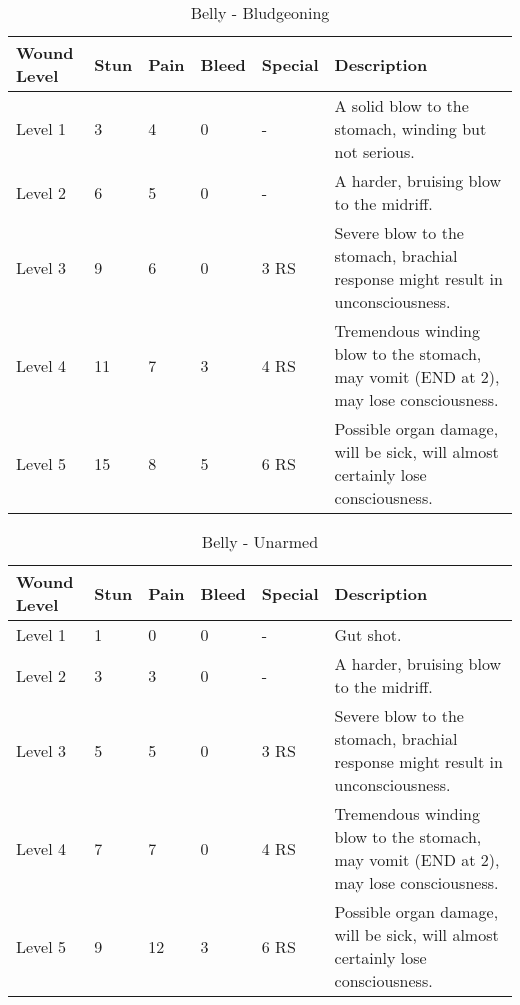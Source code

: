 \documentclass[oneside,11pt,english]{book}
\begin{document}
\begin{table}[hb] %
	\caption{Belly - Bludgeoning}
	\label{wound:Belly - Bludgeoning}
	\begin{tabu} to 
Wound Level &Stun &Pain &Bleed &Special &Description\\\toprule
Level 1& 3& 4& 0& - &A solid blow to the stomach, winding but not serious.\\
Level 2& 6& 5& 0& - &A harder, bruising blow to the midriff.\\
Level 3& 9& 6& 0&  3 RS &Severe blow to the stomach, brachial response might result in unconsciousness.\\
Level 4& 11& 7& 3&  4 RS &Tremendous winding blow to the stomach, may vomit (END at 2), may lose consciousness.\\
Level 5& 15& 8& 5&  6 RS &Possible organ damage, will be sick, will almost certainly lose consciousness.\\
	\end{tabu}
\end{table}

\begin{table}[hb] %
	\caption{Belly - Unarmed}
	\label{wound:Belly - Unarmed}
	\begin{tabu} to 
Wound Level &Stun &Pain &Bleed &Special &Description\\\toprule
Level 1& 1& 0& 0& - &Gut shot.\\
Level 2& 3& 3& 0& - &A harder, bruising blow to the midriff.\\
Level 3& 5& 5& 0&  3 RS &Severe blow to the stomach, brachial response might result in unconsciousness.\\
Level 4& 7& 7& 0&  4 RS &Tremendous winding blow to the stomach, may vomit (END at 2), may lose consciousness.\\
Level 5& 9& 12& 3&  6 RS &Possible organ damage, will be sick, will almost certainly lose consciousness.\\
	\end{tabu}
\end{table}
	\clearpage
\end{document}
